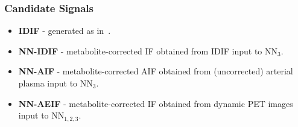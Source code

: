             \subsubsection{Candidate Signals} \label{sec:a_bayesian_neural_network-based_method_for_the_extraction_of_a_metabolite_corrected_arterial_input_function_from_dynamic_pbr28_pet_appendix_methods_evaluation_candidate_signals}
                \begin{itemize}
                    \item \textbf{\gls{IDIF}} - generated as in~.
                    
                    \item \textbf{\gls{NN}-\gls{IDIF}} - metabolite-corrected \gls{IF} obtained from \gls{IDIF} input to \gls{NN}$_3$.
                    
                    \item \textbf{\gls{NN}-\gls{AIF}} - metabolite-corrected \gls{AIF} obtained from (uncorrected) arterial plasma input to \gls{NN}$_3$.
                    
                    \item \textbf{\gls{NN}-\gls{AE}\gls{IF}} - metabolite-corrected \gls{IF} obtained from dynamic \gls{PET} images input to \gls{NN}$_{1, 2, 3}$.
                \end{itemize}
    
